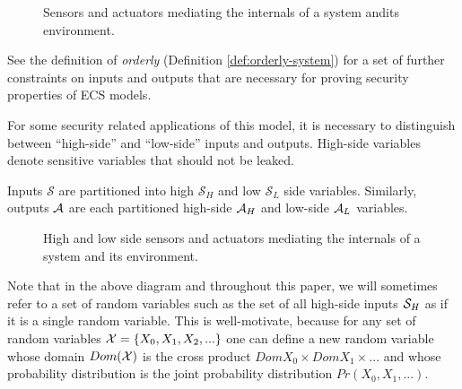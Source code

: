 \documentclass[../thesis.tex]{subfiles}
\begin{document}
\begin{figure}
\begin{center}
\end{center}
\caption{Sensors and actuators mediating the internals of a system andits environment.}
\end{figure}

See the definition of \emph{orderly} (Definition \ref{def:orderly-system})
for a set of further constraints on inputs and outputs
that are necessary for proving security properties of ECS models.

For some security related applications of this model,
it is necessary to distinguish between ``high-side''
and ``low-side'' inputs and outputs.
High-side variables denote sensitive variables
that should not be leaked.

\begin{dfn}
  Inputs $\mathcal{S}$ are partitioned into high $\mathcal{S}_H$
  and low $\mathcal{S}_L$ side variables.
  Similarly, outputs $\mathcal{A}$ are each partitioned
  high-side $\mathcal{A}_H$ and low-side $\mathcal{A}_L$ variables.
\end{dfn}

\begin{figure}
\begin{center}
\end{center}
\caption{High and low side sensors and actuators mediating
the internals of a system and its environment.}
\end{figure}

Note that in the above diagram and throughout this paper,
we will sometimes refer to a set of random variables
such as the set of all high-side inputs $\mathcal{S}_H$
as if it is a single random variable.
This is well-motivate, because for any set of random
variables $\mathcal{X} = \{X_0, X_1, X_2, ...\}$
one can define a new random variable
whose domain $Dom(\mathcal{X})$ is the cross product
$Dom{X_0} \times Dom{X_1} \times ...$ and whose
probability distribution is the joint probability
distribution $Pr(X_0, X_1, ...)$.
\end{document}
